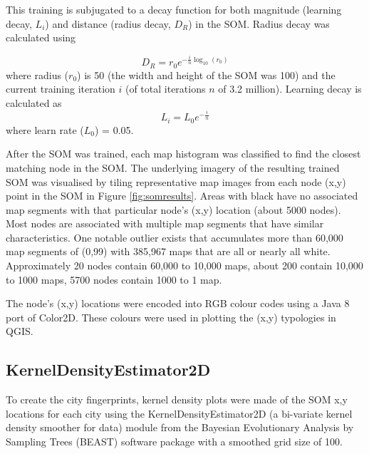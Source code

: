 \documentclass[9pt,twocolumn,twoside,lineno]{pnas-new}
\begin{document}
{This training is subjugated to a decay function for both magnitude (learning decay, $L_{i}$) and distance (radius decay, $D_{R}$) in the SOM. Radius decay was calculated using

\begin{equation} 
D_{R} = r_{0} e^{-\frac{i}{n} \log _{10} (r_{0})}
\end{equation}
where radius ($r_{0}$) is 50 (the width and height of the SOM was 100) and the current training iteration $i$ (of total iterations $n$ of 3.2 million). Learning decay is calculated as
\begin{equation} 
L_{i} = L_{0} e^{-\frac{i}{n}}
\end{equation}
where learn rate ($L_{0}$) = 0.05.

After the SOM was trained, each map histogram was classified to find the closest matching node in the SOM. The underlying imagery of the resulting trained SOM was visualised by tiling representative map images from each node (x,y) point in the SOM in Figure \ref{fig:somresults}. Areas with black have no associated map segments with that particular node's (x,y) location (about 5000 nodes). Most nodes are associated with multiple map segments that have similar characteristics. One notable outlier exists that accumulates more than 60,000 map segments of (0,99) with 385,967 maps that are all or nearly all white. Approximately 20 nodes contain 60,000 to 10,000 maps, about 200 contain 10,000 to 1000 maps, 5700 nodes contain 1000 to 1 map.



The node's (x,y) locations were encoded into RGB colour codes using a Java 8 port of Color2D\cite{Jackle2017,Steiger2015}. These colours were used in plotting the (x,y) typologies in QGIS\cite{QGIS2009}.


\subsection*{KernelDensityEstimator2D}\label{kerneldensity}

To create the city fingerprints, kernel density plots were made of the SOM x,y locations for each city using the KernelDensityEstimator2D (a bi-variate kernel density smoother for data) module from the Bayesian Evolutionary Analysis by Sampling Trees (BEAST) software package \cite{Suchard2018} with a smoothed grid size of 100.


}
\end{document}
